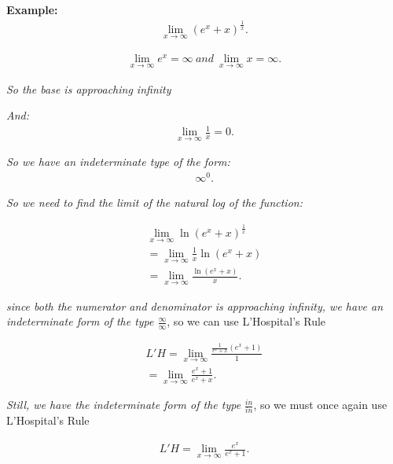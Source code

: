 \documentclass{report}
\begin{document}
  \bigbreak \noindent 
  \begin{mdframed}
    \textbf{Example: }
    \begin{align*}
      \lim_{x \to \infty}{(e^{x}+x)^{\frac{1}{x}}}
    .\end{align*}
  \end{mdframed}

  \begin{align*}
    \lim_{x \to \infty}{e^{x}} = \infty\ and\ \lim_{x \to \infty}{x} = \infty
  .\end{align*}

  \bigbreak \noindent 
  \textit{So the base is approaching infinity}

  \bigbreak \noindent 
  \textit{And:}
  \begin{align*}
    \lim_{x \to \infty}{\frac{1}{x}} = 0
  .\end{align*}

  \bigbreak \noindent 
  \textit{So we have an indeterminate type of the form:}
  \begin{align*}
    \infty^{0}
  .\end{align*}

  \bigbreak \noindent 
  \textit{So we need to find the limit of the natural log of the function:}

  \begin{align*}
    \lim_{x \to \infty}{\ln{(e^{x}+x)^{\frac{1}{x}}}} \\
    =\lim_{x \to \infty}{\frac{1}{x}\ln{(e^{x}+x)}} \\
    = \lim_{x \to \infty}{\frac{\ln{(e^{x}+x)}}{x}}
  .\end{align*}

  \bigbreak \noindent 
  \textit{since both the numerator and denominator is approaching infinity, we have an indeterminate form of the type $\frac{\infty}{\infty} $}, so we can use L'Hospital's Rule

  \begin{align*}
    L'H = \lim_{x \to \infty}{\frac{\frac{1}{e^{x}+x}(e^{x}+1)}{1}} \\
    = \lim_{x \to \infty}\frac{e^{x}+1}{e^{x}+x}
  .\end{align*}

  \bigbreak \noindent 
  \textit{Still, we have the indeterminate form of the type $\frac{in}{in} $}, so we
  must once again use L'Hospital's Rule

  \begin{align*}
    L'H = \lim_{x \to \infty}{\frac{e^{x}}{e^{x}+1}}
  .\end{align*}
\end{document}
